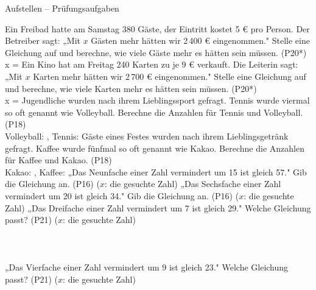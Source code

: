 \begin{aufgabe}{Aufstellen – Prüfungsaufgaben}
\begin{teile}
\steil Ein Freibad hatte am Samstag 380 Gäste, der Eintritt kostet 5 € pro Person. Der Betreiber sagt: „Mit $x$ Gästen mehr hätten wir 2\,400 € eingenommen." Stelle eine Gleichung auf und berechne, wie viele Gäste mehr es hätten sein müssen. \hfill (P20*) \\ x = \leerfeld
\steil Ein Kino hat am Freitag 240 Karten zu je 9 € verkauft. Die Leiterin sagt: „Mit $x$ Karten mehr hätten wir 2\,700 € eingenommen." Stelle eine Gleichung auf und berechne, wie viele Karten mehr es hätten sein müssen. \hfill (P20*) \\ x = \leerfeld
{} Jugendliche wurden nach ihrem Lieblingssport gefragt. Tennis wurde viermal so oft genannt wie Volleyball. Berechne die Anzahlen für Tennis und Volleyball. \hfill (P18) \\

Volleyball: \leerfeld , Tennis: \leerfeld
{} Gäste eines Festes wurden nach ihrem Lieblingsgetränk gefragt. Kaffee wurde fünfmal so oft genannt wie Kakao. Berechne die Anzahlen für Kaffee und Kakao. \hfill (P18) \\

Kakao: \leerfeld , Kaffee: \leerfeld
\teil „Das Neunfache einer Zahl vermindert um 15 ist gleich 57." Gib die Gleichung an. \hfill (P16) ($x$: die gesuchte Zahl)
\teil „Das Sechsfache einer Zahl vermindert um 20 ist gleich 34." Gib die Gleichung an. \hfill (P16) ($x$: die gesuchte Zahl)
\teil „Das Dreifache einer Zahl vermindert um 7 ist gleich 29." Welche Gleichung passt? \hfill (P21) ($x$: die gesuchte Zahl) \\  \\  \\  \\ 
\teil „Das Vierfache einer Zahl vermindert um 9 ist gleich 23." Welche Gleichung passt? \hfill (P21) ($x$: die gesuchte Zahl) \\  \\  \\  \\ 
\end{teile}
\end{aufgabe}

